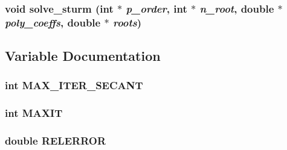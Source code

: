 \subsubsection{\setlength{\rightskip}{0pt plus 5cm}void solve\_\-sturm (int $\ast$ {\em p\_\-order}, int $\ast$ {\em n\_\-root}, double $\ast$ {\em poly\_\-coeffs}, double $\ast$ {\em roots})}\label{PSturm_8h_fb3003ea1933484ebb83d4b7db3ace51}




\subsection{Variable Documentation}
\subsubsection{\setlength{\rightskip}{0pt plus 5cm}int {\bf MAX\_\-ITER\_\-SECANT}}\label{PSturm_8h_2a7ead97e373861fd5dc7b48f9acf7cd}


\subsubsection{\setlength{\rightskip}{0pt plus 5cm}int {\bf MAXIT}}\label{PSturm_8h_86b9bfb6526c00565a19172434d28edb}


\subsubsection{\setlength{\rightskip}{0pt plus 5cm}double {\bf RELERROR}}\label{PSturm_8h_b853babc41162e2504c524ce8e12a565}


